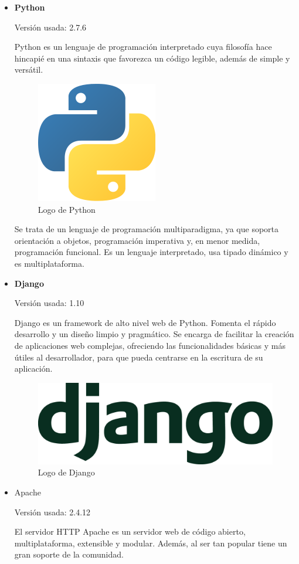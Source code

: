 \begin{itemize}
	\item \textbf{Python}
	
		Versión usada: 2.7.6
		
		Python \cite{python} es un lenguaje de programación interpretado cuya filosofía hace hincapié en una sintaxis que favorezca un código legible, además de simple y versátil.
				
		\bigskip
		\begin{figure}[h]
			\centering
			\includegraphics[width=0.2\linewidth]{../images/python}
			\caption[Logo de Python]{Logo de Python}
			\label{fig:pythonlogo}
		\end{figure}
		
		Se trata de un lenguaje de programación multiparadigma, ya que soporta orientación a objetos, programación imperativa y, en menor medida, programación funcional. Es un lenguaje interpretado, usa tipado dinámico y es multiplataforma.
		
	\item \textbf{Django}
	
		Versión usada: 1.10
		
		Django \cite{django} es un framework de alto nivel web de Python. Fomenta el rápido desarrollo y un diseño limpio y pragmático. Se encarga de facilitar la creación de aplicaciones web complejas, ofreciendo las funcionalidades básicas y más útiles al desarrollador, para que pueda centrarse en la escritura de su aplicación.
		
		\bigskip
		\begin{figure}[h]
			\centering
			\includegraphics[width=0.3\linewidth]{../images/djangologo}
			\caption[Logo de Django]{Logo de Django}
			\label{fig:djangologo}
		\end{figure}
				
	\item Apache
	
		Versión usada: 2.4.12
		
		El servidor HTTP Apache \cite{apache} es un servidor web de código abierto, multiplataforma, extensible y modular. Además, al ser tan popular tiene un gran soporte de la comunidad.
		

\end{itemize}
